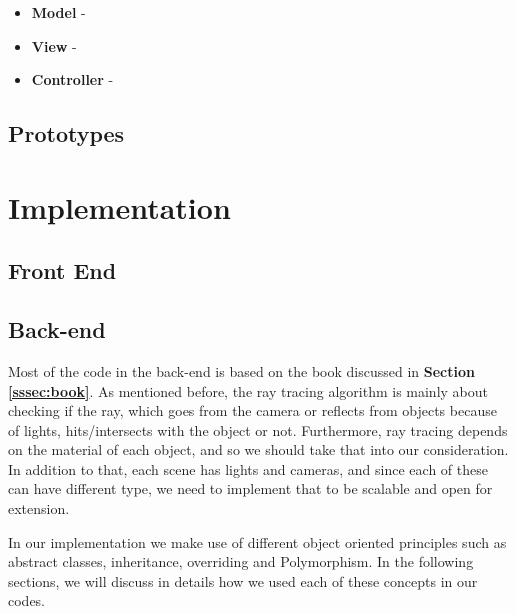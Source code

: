 \documentclass[a4paper]{article}
\begin{document}
	\begin{itemize}
		\item \textbf{Model} - 
		\item \textbf{View} - 
		\item \textbf{Controller} - 
	\end{itemize}
	
	
	\subsection{Prototypes}
	
	\section{Implementation}
	
	
	\subsection{Front End}
	\subsection{Back-end}
	Most of the code in the back-end is based on the book discussed in \textbf{Section \ref{sssec:book}}. As mentioned before, the ray tracing algorithm is mainly about checking if the ray, which goes from the camera or reflects from objects because of lights, hits/intersects with the object or not. Furthermore, ray tracing depends on the material of each object, and so we should take that into our consideration. In addition to that, each scene has lights and cameras, and since each of these can have different type, we need to implement that to be scalable and open for extension.\\
	\par In our implementation we make use of different object oriented principles such as abstract classes, inheritance, overriding and Polymorphism. In the following sections, we will discuss in details how we used each of these concepts in our codes.
\end{document}
